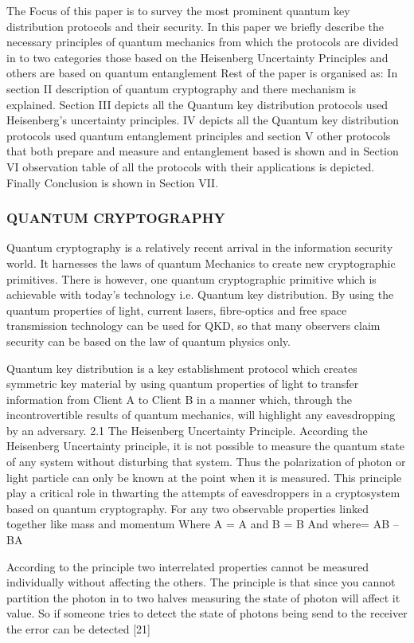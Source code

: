 The Focus of this paper is to survey the most prominent quantum key distribution protocols and their security. In this paper we briefly describe the necessary principles of quantum mechanics from which the protocols are divided in to two categories those based on the Heisenberg Uncertainty Principles and others are based on quantum entanglement Rest of the paper is organised as: In section II description of quantum cryptography and there mechanism is explained. Section III depicts all the Quantum key distribution protocols used Heisenberg's uncertainty principles. IV depicts all the Quantum key distribution protocols used quantum entanglement principles and section V other protocols that both prepare and measure and entanglement based is shown and in Section VI observation table of all the protocols with their applications is depicted. Finally Conclusion is shown in Section VII.

\subsubsection{QUANTUM CRYPTOGRAPHY}
Quantum cryptography is a relatively recent arrival in the information security world. It harnesses the laws of quantum Mechanics to create new cryptographic primitives. There is however, one quantum cryptographic primitive which is achievable with today's technology i.e. Quantum key distribution. By using the quantum properties of light, current lasers, fibre-optics and free space transmission technology can be used for QKD, so that many observers claim security can be based on the law of quantum physics only.

Quantum key distribution is a key establishment protocol which creates symmetric key material by using quantum properties of light to transfer information from Client A to Client B in a manner which, through the incontrovertible results of quantum mechanics, will highlight any eavesdropping by an adversary.
2.1 The Heisenberg Uncertainty Principle. According the Heisenberg Uncertainty principle, it is not possible to measure the quantum state of any system without disturbing that system. Thus the polarization of photon or light particle can only be known at the point when it is measured. This principle play a critical role in thwarting the attempts of eavesdroppers in a cryptosystem based on quantum cryptography.
For any two observable properties linked together like mass and momentum Where A = A and B = B And where= AB – BA

According to the principle two interrelated properties cannot be measured individually without affecting the others. The principle is that since you cannot partition the photon in to two halves measuring the state of photon will affect it value. So if someone tries to detect the state of photons being send to the receiver the error can be detected [21]


